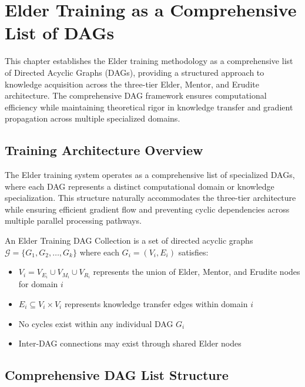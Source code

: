 \chapter{Elder Training as a Comprehensive List of DAGs}

\begin{chaptersummary}
This chapter establishes the Elder training methodology as a comprehensive list of Directed Acyclic Graphs (DAGs), providing a structured approach to knowledge acquisition across the three-tier Elder, Mentor, and Erudite architecture. The comprehensive DAG framework ensures computational efficiency while maintaining theoretical rigor in knowledge transfer and gradient propagation across multiple specialized domains.
\end{chaptersummary}

\section{Training Architecture Overview}

The Elder training system operates as a comprehensive list of specialized DAGs, where each DAG represents a distinct computational domain or knowledge specialization. This structure naturally accommodates the three-tier architecture while ensuring efficient gradient flow and preventing cyclic dependencies across multiple parallel processing pathways.

\begin{definition}
An Elder Training DAG Collection is a set of directed acyclic graphs $\mathcal{G} = \{G_1, G_2, \ldots, G_k\}$ where each $G_i = (V_i, E_i)$ satisfies:
\begin{itemize}
    \item $V_i = V_{E_i} \cup V_{M_i} \cup V_{R_i}$ represents the union of Elder, Mentor, and Erudite nodes for domain $i$
    \item $E_i \subseteq V_i \times V_i$ represents knowledge transfer edges within domain $i$
    \item No cycles exist within any individual DAG $G_i$
    \item Inter-DAG connections may exist through shared Elder nodes
\end{itemize}
\end{definition}

\section{Comprehensive DAG List Structure}

